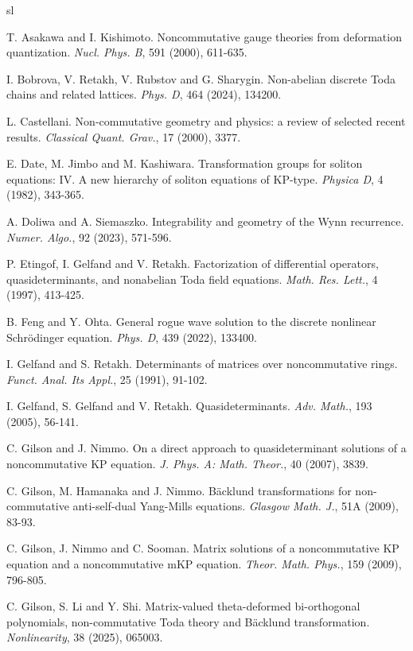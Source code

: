 \documentclass[11p,reqno]{amsart}
\numberwithin{equation}{section}
\numberwithin{equation}{section}
\begin{document}
\begin{thebibliography}{sl}

T. Asakawa and I. Kishimoto. 
Noncommutative gauge theories from deformation quantization. 
\emph{Nucl. Phys. B}, 591 (2000), 611-635.

I. Bobrova, V. Retakh, V. Rubstov and G. Sharygin. 
Non-abelian discrete Toda chains and related lattices.
\emph{Phys. D}, 464 (2024), 134200.

L. Castellani.
Non-commutative geometry and physics: a review of selected recent results. 
\emph{Classical Quant. Grav.}, 17 (2000), 3377.

E. Date, M. Jimbo and M. Kashiwara.
Transformation groups for soliton equations: IV. A new hierarchy of soliton equations of KP-type.
\emph{Physica D}, 4 (1982), 343-365.

A. Doliwa and A. Siemaszko.
Integrability and geometry of the Wynn recurrence.
\emph{Numer. Algo.}, 92 (2023), 571-596.

P. Etingof, I. Gelfand and V. Retakh.
Factorization of differential operators, quasideterminants, and nonabelian Toda field equations. 
\emph{Math. Res. Lett.}, 4 (1997), 413-425.

B. Feng and Y. Ohta.
General rogue wave solution to the discrete nonlinear Schrödinger equation.
\emph{Phys. D}, 439 (2022), 133400.

I. Gelfand and S. Retakh. 
Determinants of matrices over noncommutative rings. 
\emph{Funct. Anal. Its Appl.}, 25 (1991), 91-102. 

I. Gelfand, S. Gelfand and V. Retakh. 
Quasideterminants. 
\emph{Adv. Math.}, 193 (2005), 56-141.

C. Gilson and J. Nimmo. 
On a direct approach to quasideterminant solutions of a noncommutative KP equation. \emph{J. Phys. A: Math. Theor.}, 40 (2007), 3839. 

C. Gilson, M. Hamanaka and J. Nimmo.
B\"acklund transformations for non-commutative anti-self-dual Yang-Mills equations.
\emph{Glasgow Math. J.}, 51A (2009), 83-93.

C. Gilson, J. Nimmo and C. Sooman. 
Matrix solutions of a noncommutative KP equation and a noncommutative mKP equation. \emph{Theor. Math. Phys.}, 159 (2009), 796-805.

C. Gilson, S. Li and Y. Shi.
Matrix-valued theta-deformed bi-orthogonal polynomials, non-commutative Toda theory and B\"acklund transformation. \emph{Nonlinearity}, 38 (2025), 065003.


\end{thebibliography}
\end{document}
